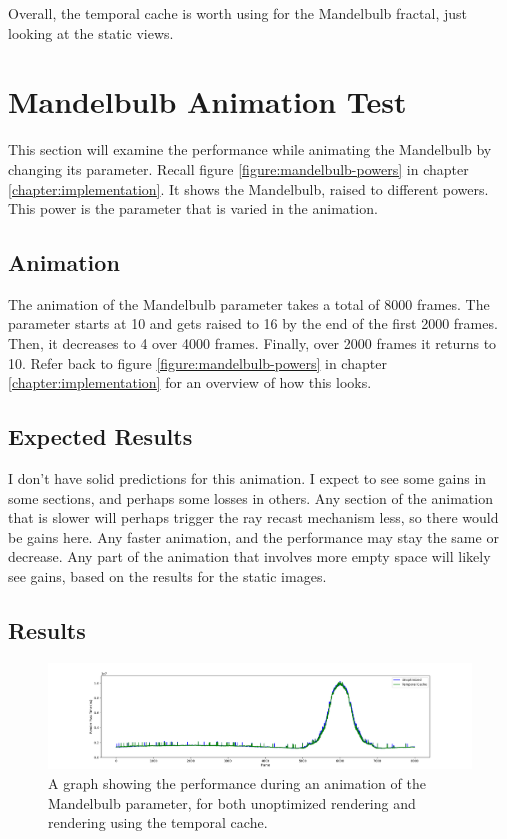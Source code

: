 Overall, the temporal cache is worth using for the Mandelbulb fractal, just looking at the static views.

\section{Mandelbulb Animation Test}

This section will examine the performance while animating the Mandelbulb by changing its parameter. Recall figure \ref{figure:mandelbulb-powers} in chapter \ref{chapter:implementation}. It shows the Mandelbulb, raised to different powers. This power is the parameter that is varied in the animation.

\subsection{Animation}

The animation of the Mandelbulb parameter takes a total of 8000 frames. The parameter starts at 10 and gets raised to 16 by the end of the first 2000 frames. Then, it decreases to 4 over 4000 frames. Finally, over 2000 frames it returns to 10. Refer back to figure \ref{figure:mandelbulb-powers} in chapter \ref{chapter:implementation} for an overview of how this looks.

\subsection{Expected Results}

I don't have solid predictions for this animation. I expect to see some gains in some sections, and perhaps some losses in others. Any section of the animation that is slower will perhaps trigger the ray recast mechanism less, so there would be gains here. Any faster animation, and the performance may stay the same or decrease. Any part of the animation that involves more empty space will likely see gains, based on the results for the static images.

\subsection{Results}

\begin{figure}[ht]
	\centering
	\includegraphics[width=\linewidth, frame]{Images/Results/Mandelbulb-Parameter-Animation.png}
	\caption{A graph showing the performance during an animation of the Mandelbulb parameter, for both unoptimized rendering and rendering using the temporal cache.}
	\label{figure:mandelbulb-parameter-animation}
\end{figure}


